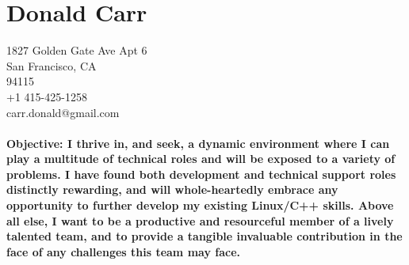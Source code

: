 \documentclass{article}
\begin{document}

\centering
\section*{Donald Carr}
1827 Golden Gate Ave Apt 6\\
San Francisco, CA \\
94115 \\
+1 415-425-1258 \\
carr.donald@gmail.com \\
\hspace*{\fill} \\

\bf{Objective:}
I thrive in, and seek, a dynamic environment where I can play a multitude of technical roles and will be exposed to a variety of problems. I have found both development and technical support roles distinctly rewarding, and will whole-heartedly embrace any opportunity to further develop my existing Linux/C++ skills. Above all else, I want to be a productive and resourceful member of a lively talented team, and to provide a tangible invaluable contribution in the face of any challenges this team may face.
\end{document}
